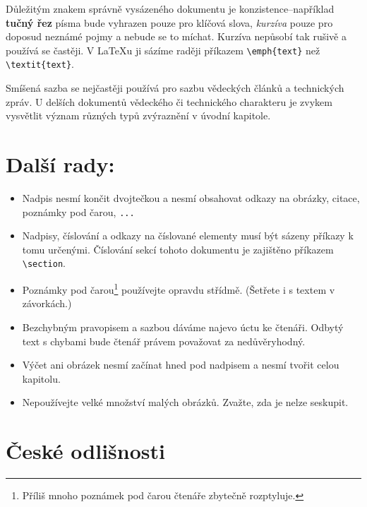 \documentclass[a4paper, 10pt, twocolumn]{article}
\begin{document}
    Důležitým znakem správně vysázeného dokumentu je konzistence--například \textbf{tučný řez} písma bude vyhrazen pouze pro klíčová slova, \emph{kurzíva} pouze pro doposud neznámé pojmy a nebude se to míchat. Kurzíva nepůsobí tak rušivě a používá se častěji. V {\LaTeX}u ji sázíme raději příkazem \verb|\emph{text}| než \verb|\textit{text}|.

    Smíšená sazba se nejčastěji používá pro sazbu vě\-dec\-kých článků a technických zpráv. U delších dokumentů vědeckého či technického charakteru je zvykem vysvětlit význam různých typů zvýraznění v úvodní kapitole.
    
    \section{Další rady:}
    \label{sec:dalsiRady}
    
    \begin{itemize}
    \item Nadpis nesmí končit dvojtečkou a nesmí obsahovat odkazy na obrázky, citace, poznámky pod čarou, \texttt{...}

    \item Nadpisy, číslování a odkazy na číslované elementy musí být sázeny příkazy k tomu určenými. Číslování sekcí tohoto dokumentu je zajištěno příkazem \verb|\section|.
    
    \item Poznámky pod čarou\footnote{Příliš mnoho poznámek pod čarou čtenáře zbytečně rozptyluje.} používejte opravdu střídmě. (Šetřete i s textem v závorkách.)
    
    \item Bezchybným pravopisem a sazbou dáváme najevo úctu ke čtenáři. Odbytý text s chybami bude čtenář právem považovat za nedůvěryhodný.
    
    \item Výčet ani obrázek nesmí začínat hned pod nadpisem a nesmí tvořit celou kapitolu.
    
    \item Nepoužívejte velké množství malých obrázků. Zvažte, zda je nelze seskupit.
    \end{itemize}
    
	\section{České odlišnosti}
\end{document}
